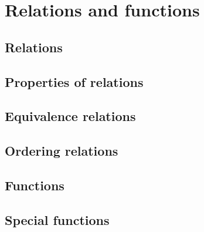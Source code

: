 
\chapter{Relations and functions}

\section{Relations}





\newpage

\section{Properties of relations}





\newpage

\section{Equivalence relations}




\newpage

\section{Ordering relations}




\newpage

\section{Functions}





\newpage

\section{Special functions}




